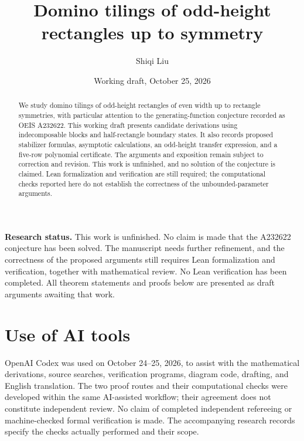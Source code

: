 \documentclass[11pt,a4paper]{amsart}
\title[Domino tilings up to symmetry]{Domino tilings of odd-height rectangles up to symmetry}
\author{Shiqi Liu}
\date{Working draft, October 25, 2026}
\theoremstyle{definition}
\theoremstyle{remark}
\numberwithin{equation}{section}
\begin{document}
\begin{abstract}
We study domino tilings of odd-height rectangles of even width up to rectangle symmetries, with particular attention to the generating-function conjecture recorded as OEIS A232622. This working draft presents candidate derivations using indecomposable blocks and half-rectangle boundary states. It also records proposed stabilizer formulas, asymptotic calculations, an odd-height transfer expression, and a five-row polynomial certificate. The arguments and exposition remain subject to correction and revision. This work is unfinished, and no solution of the conjecture is claimed. Lean formalization and verification are still required; the computational checks reported here do not establish the correctness of the unbounded-parameter arguments.
\end{abstract}
\maketitle
\noindent\textbf{Research status.}
This work is unfinished. No claim is made that the A232622 conjecture
has been solved. The manuscript needs further refinement, and the
correctness of the proposed arguments still requires Lean
formalization and verification, together with mathematical review.
No Lean verification has been completed. All theorem statements and
proofs below are presented as draft arguments awaiting that work.
\medskip








\appendix


\section*{Use of AI tools}
OpenAI Codex was used on October 24--25, 2026, to assist with the mathematical derivations, source searches, verification programs, diagram code, drafting, and English translation. The two proof routes and their computational checks were developed within the same AI-assisted workflow; their agreement does not constitute independent review. No claim of completed independent refereeing or machine-checked formal verification is made. The accompanying research records specify the checks actually performed and their scope.

\end{document}
